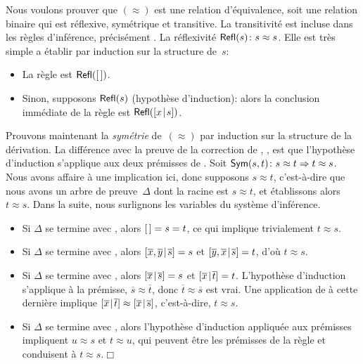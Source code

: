 Nous voulons prouver que \((\approx)\) est une relation d'équivalence,
soit une relation binaire qui est réflexive, symétrique et
transitive. La transitivité est incluse dans les règles d'inférence,
précisément . La
réflexivité \(\textsf{Refl}({s}) \colon s
\approx s\). Elle est très simple a établir par induction sur la
structure de~\(s\):
\begin{itemize}

  \item La règle  est \(\textsf{Refl}({[\,]})\).

  \item Sinon, supposons \(\textsf{Refl}({s})\) (hypothèse d'induction):
    alors la conclusion immédiate de la règle  est
    \(\textsf{Refl}({[{x}\!\mid\!{s}]})\).

\end{itemize}

Prouvons maintenant la \emph{symétrie} de~\((\approx)\) par
induction sur la structure de la
dérivation. La différence avec la preuve de la correction de
, , est que
l'hypothèse d'induction s'applique aux deux prémisses de
. Soit
\(\textsf{Sym}({s,t})\colon s \approx t \Rightarrow t \approx s\). Nous
avons affaire à une implication ici, donc supposons \(s \approx t\),
c'est-à-dire que nous avons un arbre de preuve~\(\Delta\) dont la
racine est \(s \approx t\), et établissons alors \(t \approx s\). Dans
la suite, nous surlignons les variables du système d'inférence.
\begin{itemize}

  \item Si \(\Delta\) se termine avec , alors \([\,] = s =
  t\), ce qui implique trivialement \(t \approx s\).

  \item Si \(\Delta\) se termine avec , alors
  \([{\overline{x},\overline{y}}\!\mid\!{\overline{s}}] = s\) et
  \([{\overline{y},\overline{x}}\!\mid\!{\overline{s}}] = t\), d'où \(t
  \approx s\).

  \item Si \(\Delta\) se termine avec , alors
  \([{\overline{x}}\!\mid\!{\overline{s}}] = s\) et
  \([{\overline{x}}\!\mid\!{\overline{t}}] = t\). L'hypothèse d'induction
  s'applique à la prémisse, \(\overline{s} \approx \overline{t}\),
  donc \(\overline{t} \approx \overline{s}\) est vrai. Une application
  de  à cette dernière implique
  \([{\overline{x}}\!\mid\!{\overline{t}}] \approx
  [{\overline{x}}\!\mid\!{\overline{s}}]\), c'est-à-dire, \(t \approx s\).

  \item Si \(\Delta\) se termine avec , alors
    l'hypothèse d'induction appliquée aux prémisses impliquent \(u
    \approx s\) et \(t \approx u\), qui peuvent être les prémisses de
    la règle  et conduisent à \(t \approx
    s\).\hfill\(\Box\)

\end{itemize}

